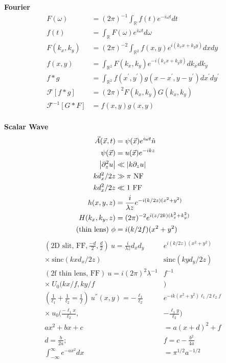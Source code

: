 \documentclass[12pt]{article}
\begin{document}
\begin{multicols}{2}

\textbf{Fourier}
\begin{align}
  F(\omega) &= (2\pi)^{-1} \int_{\mathbb{R}}
  f(t) e^{-i \omega t} dt\\
  f(t) &= \int_{\mathbb{R}} F(\omega) e^{i \omega t} d\omega\\
  F(k_x, k_y) &= (2\pi)^{-2} \int_{\mathbb{R}^2} f(x, y)
  e^{i(k_x x + k_y y)} dx dy\\
  f(x, y) &= \int_{\mathbb{R}^2} F(k_x, k_y)
  e^{-i(k_x x + k_y y)} dk_x dk_y\\
  f * g &= \int_{\mathbb{R}^2} f(x^{\prime}, y^{\prime})
  g(x - x^{\prime}, y - y^{\prime}) dx^{\prime} dy^{\prime}\\
  \mathcal{F}[f * g] &= (2\pi)^2 F(k_x, k_y) G(k_x, k_y)\\
  \mathcal{F}^{-1}[G * F] &= f(x, y) g(x, y)\\
\end{align}

\textbf{Scalar Wave}
\begin{align}
  \vec{A}(\vec{x}, t) &= \psi(\vec{x}) e^{i\omega t}\hat{n}\\
  \psi(\vec{x}) &= u(\vec{x})e^{-ikz}\\
  \abs{\partial_z^2 u} &\ll \abs{k\partial_zu}\\
  kd_x^2/2z &\gg \pi \ \textrm{NF}\\
  kd_x^2/2z &\ll 1 \ \textrm{FF}\\
  h(x, y, z) &= \frac{i}{\lambda z} e^{-i (k / 2z)(x^2 + y^2)}\\
  H(k_x, k_y, z) &= (2\pi)^{-2} e^{i (z / 2k)(k_x^2 + k_y^2)}\\
  (\textrm{thin lens}) \ \phi &= i(k/2f)(x^2+y^2)
\end{align}
\begin{align}
  (\textrm{2D slit, FF}, \frac{-d}{2}, \frac{d}{2}) \ u = \frac{i}{\lambda z} d_x d_y &e^{i(k/2z)(x^2+y^2)}\\
  \times \ \textrm{sinc}(kxd_x/2z) &\textrm{sinc}(kyd_y/2z)\\
  (\textrm{2f thin lens, FF}) \ u = i(2\pi)^2\lambda^{-1}&f^{-1}\\
  \times \ U_0(kx/f,ky/f&)\\
  (\frac{1}{\ell_1} + \frac{1}{\ell_2} = \frac{1}{f}) \ u^{''}(x, y) = - \frac{\ell_1}{\ell_2} &e^{-ik(x^2+y^2)\ell_1/2\ell_2 f}\\
  \times \ u_0(\frac{-\ell_1 x}{\ell_2}, &-\frac{\ell_1 y}{\ell_2})\\
  ax^2 + bx + c &= a(x + d)^2 + f\\
  d = \frac{b}{2a}; \ &f = c - \frac{b^2}{4a}\\
  \int_{-\infty}^{\infty} e^{-ax^2} dx &= \pi^{1/2}a^{-1/2}\\
\end{align}


\end{multicols}
\end{document}
